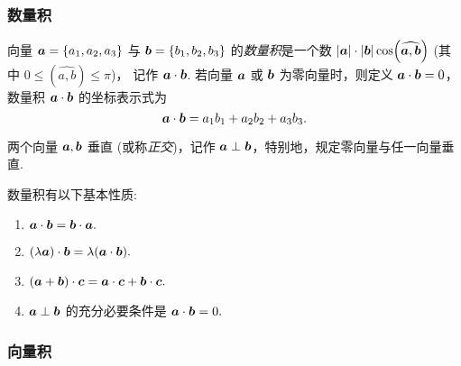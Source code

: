\subsubsection{数量积}

\begin{definition}
    向量 $ \vb*{a}=\left\{a_{1}, a_{2}, a_{3}\right\} $ 与 $ \vb*{b}=\left\{b_{1}, b_{2}, b_{3}\right\} $ 的\textit{数量积}是一个数 $ |\vb*{a}| \cdot|\vb*{b}| \cos (\widehat{\vb*{a}, \vb*{b}}) $ (其中 $ 0 \leqslant(\widehat{a, b}) \leqslant \pi$)，
    记作 $ \vb*{a} \cdot \vb*{b} $. 若向量 $ \vb*{a} $ 或 $ \vb*{b} $ 为零向量时，则定义 $ \vb*{a} \cdot \vb*{b}=0$，数量积 $ \vb*{a} \cdot \vb*{b} $ 的坐标表示式为
    $$\vb*{a} \cdot \vb*{b}=a_{1} b_{1}+a_{2} b_{2}+a_{3} b_{3} .$$
\end{definition}

\begin{definition}[向量正交]
    两个向量 $ \vb*{a}, \vb*{b} $ 垂直 (或称\textit{正交})，记作 $ \vb*{a} \perp \vb*{b} $，特别地，规定零向量与任一向量垂直.
\end{definition}

数量积有以下基本性质:
\begin{enumerate}[label=(\arabic{*})]
    \item $\vb*{a} \cdot \vb*{b}=\vb*{b} \cdot \vb*{a} .$
    \item  $(\lambda \vb*{a}) \cdot \vb*{b}=\lambda(\vb*{a} \cdot \vb*{b}) .$
    \item $(\vb*{a}+\vb*{b}) \cdot \vb*{c}=\vb*{a} \cdot \vb*{c}+\vb*{b} \cdot \vb*{c} .$
    \item $\vb*{a} \perp \vb*{b} $ 的充分必要条件是 $ \vb*{a} \cdot \vb*{b}=0 .$
\end{enumerate}

\subsubsection{向量积}


